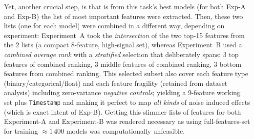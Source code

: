 \documentclass[a4paper, 9pt]{extarticle}
\begin{document}
Yet, another crucial step, is that is from this task's best models (for both Exp-A and Exp-B) the list of most important features were extracted. Then, these two lists (one for each model) were combined in a different way, depending on experiment: Experiment~A took the \emph{intersection} of the two top-15 features from the 2 lists (a compact $8$-feature, high-signal set), whereas Experiment~B used a \emph{combined average rank} with a \emph{stratified} selection that deliberately spans: 3 top features of combined ranking, 3 middle features of combined ranking, 3 bottom features from combined ranking. This selected subset also cover each feature type (binary/categorical/float) and each feature fragility (retained from dataset analysis) including zero-variance \emph{negative controls}; yielding a $9$-feature working set plus \texttt{Timestamp} and making it perfect to map \emph{all kinds} of noise induced effects (which is exact intent of Exp-B).
Getting this slimmer lists of features for both Experiment-A and Experiment-B was rendered necessary as using full-features-set for training $\approx1\,400$ models was computationally unfeasible.
\end{document}
